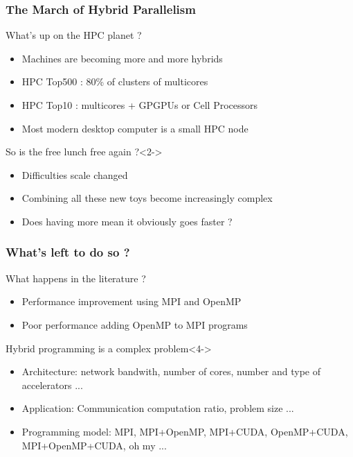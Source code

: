 \frame
{
  \frametitle{The March of Hybrid Parallelism}
  \begin{block}{What's up on the HPC planet ?}
  \begin{itemize}
  \footnotesize
   \item Machines are becoming more and more hybrids
   \item HPC Top500 : 80\% of clusters of multicores
   \item HPC Top10 : multicores + GPGPUs or Cell Processors
   \item Most modern desktop computer is a small HPC node
   \end{itemize}
  \end{block}{}

  \begin{block}{So is the free lunch free again ?}<2->
  \begin{itemize}
  \footnotesize
   \item Difficulties scale changed
   \item Combining all these new toys become increasingly complex
   \item Does having more mean it obviously goes faster ?
   \end{itemize}
  \end{block}{}
}

\frame
{
  \frametitle{What's left to do so ?}
  \begin{block}{What happens in the literature ?}
  \begin{itemize}
  \footnotesize
   \item<2-> Performance improvement using MPI and OpenMP\\
   \item<3-> Poor performance adding OpenMP to MPI programs \\
   \end{itemize}
  \end{block}{}

  \begin{block}{Hybrid programming is a complex problem}<4->
   \begin{itemize}
   \footnotesize
   \item Architecture: network bandwith, number of cores, number and type of accelerators ...\\
   \item Application: Communication computation ratio, problem size ... \\
   \item Programming model: MPI, MPI+OpenMP, MPI+CUDA, OpenMP+CUDA, MPI+OpenMP+CUDA, oh my ... \\
   \end{itemize}
  \end{block}{}
}


